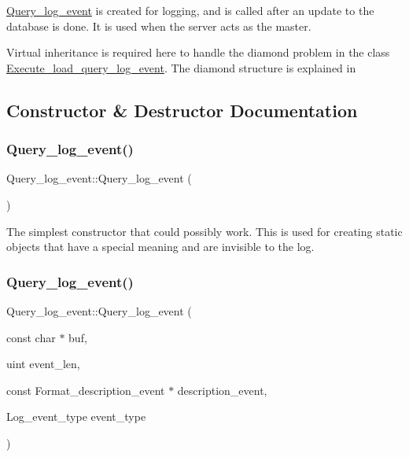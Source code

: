 \mbox{\hyperlink{classQuery__log__event}{Query\+\_\+log\+\_\+event}} is created for logging, and is called after an update to the database is done. It is used when the server acts as the master.

Virtual inheritance is required here to handle the diamond problem in the class \mbox{\hyperlink{classExecute__load__query__log__event}{Execute\+\_\+load\+\_\+query\+\_\+log\+\_\+event}}. The diamond structure is explained in  

\subsection{Constructor \& Destructor Documentation}
\mbox{\label{classQuery__log__event_a3420653875185a8dff0c28831ef7bd2a}} 
\subsubsection{\texorpdfstring{Query\+\_\+log\+\_\+event()}{Query\_log\_event()}\hspace{0.1cm}{\footnotesize\ttfamily [1/2]}}
{\footnotesize\ttfamily Query\+\_\+log\+\_\+event\+::\+Query\+\_\+log\+\_\+event (\begin{DoxyParamCaption}{ }\end{DoxyParamCaption})}

The simplest constructor that could possibly work. This is used for creating static objects that have a special meaning and are invisible to the log. \mbox{\label{classQuery__log__event_a13b9cc67eca9afb925b298ab2e02a03d}} 
\subsubsection{\texorpdfstring{Query\+\_\+log\+\_\+event()}{Query\_log\_event()}\hspace{0.1cm}{\footnotesize\ttfamily [2/2]}}
{\footnotesize\ttfamily Query\+\_\+log\+\_\+event\+::\+Query\+\_\+log\+\_\+event (\begin{DoxyParamCaption}\item[{const char $\ast$}]{buf,  }\item[{uint}]{event\+\_\+len,  }\item[{const Format\+\_\+description\+\_\+event $\ast$}]{description\+\_\+event,  }\item[{Log\+\_\+event\+\_\+type}]{event\+\_\+type }\end{DoxyParamCaption})}

